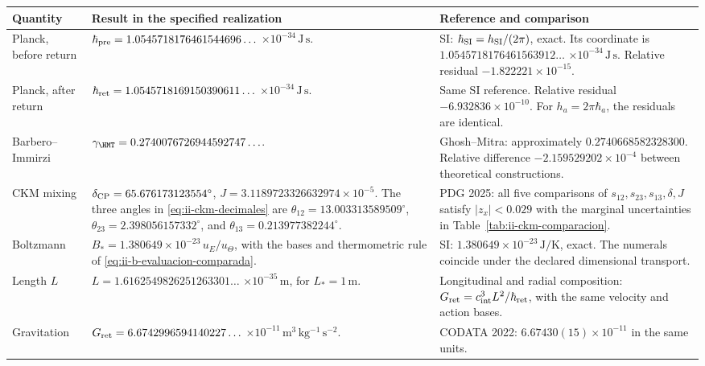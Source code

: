 \begin{table}[!htbp]
\centering\small
\setlength{\tabcolsep}{4pt}
\renewcommand{\arraystretch}{1.12}
\begin{tabularx}{\linewidth}{@{}>{\raggedright\arraybackslash}p{.16\linewidth}>{\raggedright\arraybackslash}X>{\raggedright\arraybackslash}X@{}}
\toprule
Quantity & Result in the specified realization & Reference and comparison\\
\midrule
Planck, before return
& \(\hbar_{\rm pre}=1.0545718176461544696\ldots\)
  \(\times10^{-34}\,\mathrm{J\,s}\).
& SI: \(\hbar_{\rm SI}=h_{\rm SI}/(2\pi)\), exact.
  Its coordinate is \(1.0545718176461563912\ldots\)
  \(\times10^{-34}\,\mathrm{J\,s}\).
  Relative residual \(-1.822221\times10^{-15}\).\\[4pt]
Planck, after return
& \(\hbar_{\rm ret}=1.0545718169150390611\ldots\)
  \(\times10^{-34}\,\mathrm{J\,s}\).
& Same SI reference.
  Relative residual \(-6.932836\times10^{-10}\).
  For \(h_a=2\pi\hbar_a\), the residuals are identical.\\[4pt]
Barbero--Immirzi
& \(\gamma_{\HMT}=0.2740076726944592747\ldots\).
& Ghosh--Mitra: approximately \(0.2740668582328300\).
  Relative difference \(-2.159529202\times10^{-4}\)
  between theoretical constructions.\\[4pt]
CKM mixing
& \(\delta_{\rm CP}=65.676173123554^\circ\),
  \(J=3.1189723326632974\times10^{-5}\).
  The three angles in \eqref{eq:ii-ckm-decimales} are
  \(\theta_{12}=13.003313589509^\circ\),
  \(\theta_{23}=2.398056157332^\circ\), and
  \(\theta_{13}=0.213977382244^\circ\).
& PDG 2025: all five comparisons of
  \(s_{12},s_{23},s_{13},\delta,J\) satisfy \(|z_x|<0.029\)
  with the marginal uncertainties in
  Table~\ref{tab:ii-ckm-comparacion}.\\[4pt]
Boltzmann
& \(B_*=1.380649\times10^{-23}\,u_E/u_\Theta\),
  with the bases and thermometric rule of
  \eqref{eq:ii-b-evaluacion-comparada}.
& SI: \(1.380649\times10^{-23}\,\mathrm{J/K}\), exact.
  The numerals coincide under the declared dimensional transport.\\[4pt]
Length \(L\)
& \(L=1.6162549826251263301\ldots\)
  \(\times10^{-35}\,\mathrm m\), for \(L_*=1\,\mathrm m\).
& Longitudinal and radial composition:
  \(G_{\rm ret}=c_{\rm int}^3L^2/\hbar_{\rm ret}\),
  with the same velocity and action bases.\\[4pt]
Gravitation
& \(G_{\rm ret}=6.6742996594140227\ldots\)
  \(\times10^{-11}\,\mathrm{m^3\,kg^{-1}\,s^{-2}}\).
& CODATA 2022: \(6.67430(15)\times10^{-11}\) in the same units.

\end{tabularx}
\end{table}
